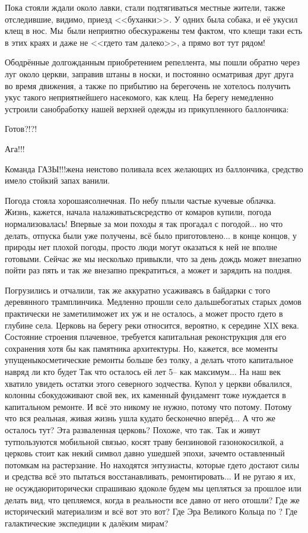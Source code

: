 Пока стояли ждали около лавки, стали подтягиваться местные жители, также отследившие, видимо, приезд <<буханки>>. У одних была собака, и её укусил клещ в нос. Мы~были неприятно обескуражены тем фактом, что клещи таки есть в этих краях и даже не <<где\sdash то там далеко>>, а прямо вот тут рядом!

Ободрённые долгожданным приобретением репеллента, мы пошли обратно через луг около церкви, заправив штаны в носки, и постоянно осматривая друг друга во время движения, а также по прибытию на берег\mdash очень не хотелось получить укус такого неприятнейшего насекомого, как клещ. На берегу немедленно устроили санобработку нашей верхней одежды из прикупленного баллончика:

\diagdash Готов?!?!

\diagdash Ага!!!

\diagdash Команда ГАЗЫ!!!\mdash жена неистово поливала всех желающих из баллончика, средство имело стойкий запах ванили.

Погода стояла хорошая\mdash солнечная. По небу плыли частые кучевые облачка. Жизнь, кажется, начала налаживаться\mdash средство от комаров купили, погода нормализовалась! Впервые за мои походы я так прогадал с погодой$\ldots$ но что делать, отпуска были уже получены, всё было приготовлено$\ldots$ в конце концов, у природы нет плохой погоды, просто люди могут оказаться к ней не вполне готовыми. Сейчас же мы несколько привыкли, что за день дождь может внезапно пойти раз пять и так же внезапно прекратиться, а может и зарядить на полдня. 

Погрузились и отчалили, так же аккуратно усаживаясь в байдарки с того деревянного трамплинчика. Медленно прошли село дальше\mdash богатых старых домов практически не заметили\mdash может их уж и не осталось, а может просто где\sdash то в глубине села. Церковь на берегу реки относится, вероятно, к середине XIX века. Состояние строения плачевное, требуется капитальная реконструкция для его сохранения хотя бы как памятника архитектуры. Но, кажется, все моменты упущены\mdash косметические ремонты больше без толку, а делать что\sdash то капитальное навряд ли кто будет Так что осталось ей лет 5\thinspace\nobreakdash-- как максимум$\ldots$ На наш век хватило увидеть остатки этого северного зодчества. Купол у церкви обвалился, колонны сбоку\mdash доживают свой век, их каменный фундамент тоже нуждается в капитальном ремонте. И всё это никому не нужно, потому что потому. Потому что вся реальная, живая жизнь ушла куда\sdash то бесконечно вперёд$\ldots$ А что же осталось тут? Эта разваленная церковь? Похоже, что так. Так и живут тут\mdash пользуются мобильной связью, косят траву бензиновой газонокосилкой, а церковь стоит как некий символ давно ушедшей эпохи, зачем\sdash то оставленный потомкам на растерзание. Но находятся энтузиасты, которые где\sdash то достают силы и средства всё это пытаться восстанавливать, ремонтировать$\ldots$ И не ругаю я их, не осуждаю\mdash риторически спрашиваю я\mdash доколе будем мы цепляться за прошлое или делать вид, что цепляемся, когда в реальности все давно от него отошли? Где же исторический материализм и всё вот это вот? Где Эра Великого Кольца по \cite{ТуманностьАндромеды}? Где галактические экспедиции к далёким мирам?

